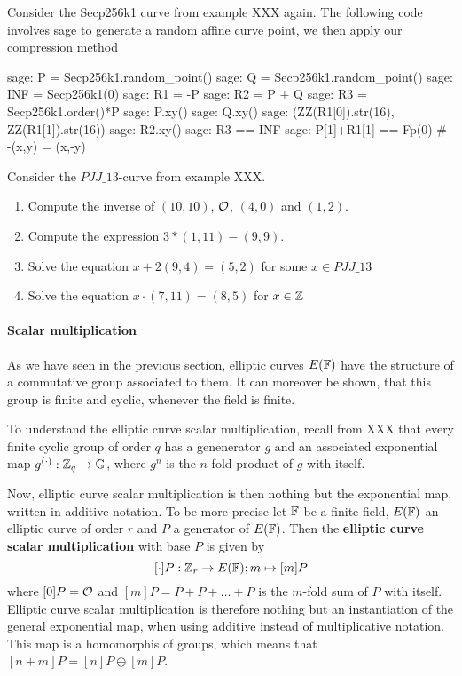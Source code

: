 \begin{example}
Consider the Secp256k1 curve from example XXX again. The following code involves sage to generate a random affine curve point, we then apply our compression method   
\begin{sagecommandline}
sage: P = Secp256k1.random_point()
sage: Q = Secp256k1.random_point()
sage: INF = Secp256k1(0)
sage: R1 = -P
sage: R2 = P + Q
sage: R3 = Secp256k1.order()*P
sage: P.xy()
sage: Q.xy()
sage: (ZZ(R1[0]).str(16), ZZ(R1[1]).str(16))
sage: R2.xy()
sage: R3 == INF
sage: P[1]+R1[1] == Fp(0) # -(x,y) = (x,-y)
\end{sagecommandline}
\end{example}
\begin{exercise}
Consider the $\mathit{PJJ\_13}$-curve from example XXX. 
\begin{enumerate}
\item Compute the inverse of $(10,10)$, $\mathcal{O}$, $(4,0)$ and $(1,2)$.
\item Compute the expression $3*(1,11) - (9,9)$.
\item Solve the equation $x + 2(9,4) = (5,2) $ for some $x\in \mathit{PJJ\_13}$
\item Solve the equation $x\cdot (7,11) = (8,5)$ for $x\in \mathbb{Z}$
\end{enumerate}
\end{exercise}
\paragraph{Scalar multiplication}
As we have seen in the previous section, elliptic curves $E(\mathbb{F})$ have the structure of a commutative group associated to them. It can moreover be shown, that this group is finite and cyclic, whenever the field is finite. 

To understand the elliptic curve scalar multiplication, recall from XXX that every finite cyclic group of order $q$ has a genenerator $g$ and an associated exponential map $g^{(\cdot)}: \mathbb{Z}_q \to \mathbb{G}$, where $g^n$ is the $n$-fold product of $g$ with itself.  

Now, elliptic curve scalar multiplication is then nothing but the exponential map, written in additive notation. To be more precise let $\mathbb{F}$ be a finite field, $E(\mathbb{F})$ an elliptic curve of order $r$ and $P$ a generator of $E(\mathbb{F})$. Then the \textbf{elliptic curve scalar multiplication} with base $P$ is given by
$$
[\cdot]P: \mathbb{Z}_r \to E(\mathbb{F}); m \mapsto [m]P
$$
where $[0]P = \mathcal{O}$ and $[m]P = P+P+\ldots + P$ is the $m$-fold sum of $P$ with itself. Elliptic curve scalar multiplication is therefore nothing but an instantiation of the general exponential map, when using additive instead of multiplicative notation. This map is a homomorphis of groups, which means that $[n+m]P = [n]P \oplus [m]P$. 

